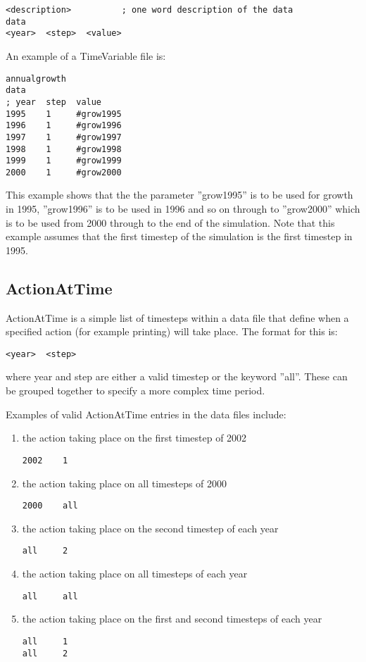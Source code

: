 \documentclass[10pt,twoside]{book}
\begin{document}
{\small\begin{verbatim}
<description>          ; one word description of the data
data
<year>  <step>  <value>
\end{verbatim}}

An example of a TimeVariable file is:

{\small\begin{verbatim}
annualgrowth
data
; year  step  value
1995    1     #grow1995
1996    1     #grow1996
1997    1     #grow1997
1998    1     #grow1998
1999    1     #grow1999
2000    1     #grow2000
\end{verbatim}}

This example shows that the the parameter ''grow1995'' is to be used for growth in 1995, ''grow1996'' is to be used in 1996 and so on through to ''grow2000'' which is to be used from 2000 through to the end of the simulation.  Note that this example assumes that the first timestep of the simulation is the first timestep in 1995.

\subsection{ActionAtTime}
ActionAtTime is a simple list of timesteps within a data file that define when a specified action (for example printing) will take place.  The format for this is:

{\small\begin{verbatim}
<year>  <step>
\end{verbatim}}

where year and step are either a valid timestep or the keyword ''all''.  These can be grouped together to specify a more complex time period.

\bigskip
Examples of valid ActionAtTime entries in the data files include:

\begin{enumerate}
\item the action taking place on the first timestep of 2002
{\small\begin{verbatim}
2002    1
\end{verbatim}}
\item the action taking place on all timesteps of 2000
{\small\begin{verbatim}
2000    all
\end{verbatim}}
\item the action taking place on the second timestep of each year
{\small\begin{verbatim}
all     2
\end{verbatim}}
\item the action taking place on all timesteps of each year
{\small\begin{verbatim}
all     all
\end{verbatim}}
\item the action taking place on the first and second timesteps of each year
{\small\begin{verbatim}
all     1
all     2
\end{verbatim}}
\end{enumerate}
\end{document}
